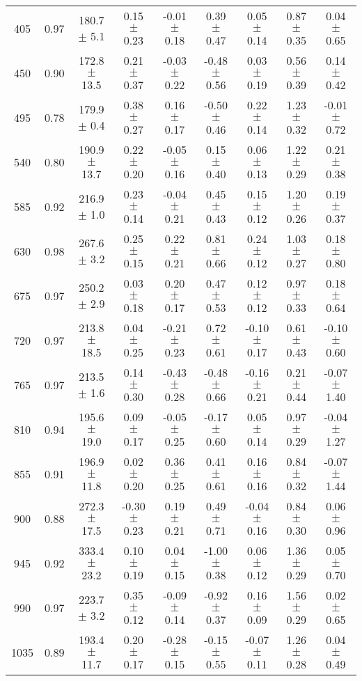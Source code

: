 \documentclass[twocolumn]{aastex61}%
\begin{document}
\begin{table*}[ht]
\begin{tabular}{ccc|ccccc|c}
405 & 0.97 & 180.7 $\pm$ 5.1 & 0.15 $\pm$ 0.23 & -0.01 $\pm$ 0.18 & 0.39 $\pm$ 0.47 & 0.05 $\pm$ 0.14 & 0.87 $\pm$ 0.35 & 0.04 $\pm$ 0.65\\
450 & 0.90 & 172.8 $\pm$ 13.5 & 0.21 $\pm$ 0.37 & -0.03 $\pm$ 0.22 & -0.48 $\pm$ 0.56 & 0.03 $\pm$ 0.19 & 0.56 $\pm$ 0.39 & 0.14 $\pm$ 0.42\\
495 & 0.78 & 179.9 $\pm$ 0.4 & 0.38 $\pm$ 0.27 & 0.16 $\pm$ 0.17 & -0.50 $\pm$ 0.46 & 0.22 $\pm$ 0.14 & 1.23 $\pm$ 0.32 & -0.01 $\pm$ 0.72\\
540 & 0.80 & 190.9 $\pm$ 13.7 & 0.22 $\pm$ 0.20 & -0.05 $\pm$ 0.16 & 0.15 $\pm$ 0.40 & 0.06 $\pm$ 0.13 & 1.22 $\pm$ 0.29 & 0.21 $\pm$ 0.38\\
585 & 0.92 & 216.9 $\pm$ 1.0 & 0.23 $\pm$ 0.14 & -0.04 $\pm$ 0.21 & 0.45 $\pm$ 0.43 & 0.15 $\pm$ 0.12 & 1.20 $\pm$ 0.26 & 0.19 $\pm$ 0.37\\
630 & 0.98 & 267.6 $\pm$ 3.2 & 0.25 $\pm$ 0.15 & 0.22 $\pm$ 0.21 & 0.81 $\pm$ 0.66 & 0.24 $\pm$ 0.12 & 1.03 $\pm$ 0.27 & 0.18 $\pm$ 0.80\\
675 & 0.97 & 250.2 $\pm$ 2.9 & 0.03 $\pm$ 0.18 & 0.20 $\pm$ 0.17 & 0.47 $\pm$ 0.53 & 0.12 $\pm$ 0.12 & 0.97 $\pm$ 0.33 & 0.18 $\pm$ 0.64\\
720 & 0.97 & 213.8 $\pm$ 18.5 & 0.04 $\pm$ 0.25 & -0.21 $\pm$ 0.23 & 0.72 $\pm$ 0.61 & -0.10 $\pm$ 0.17 & 0.61 $\pm$ 0.43 & -0.10 $\pm$ 0.60\\
765 & 0.97 & 213.5 $\pm$ 1.6 & 0.14 $\pm$ 0.30 & -0.43 $\pm$ 0.28 & -0.48 $\pm$ 0.66 & -0.16 $\pm$ 0.21 & 0.21 $\pm$ 0.44 & -0.07 $\pm$ 1.40\\
810 & 0.94 & 195.6 $\pm$ 19.0 & 0.09 $\pm$ 0.17 & -0.05 $\pm$ 0.25 & -0.17 $\pm$ 0.60 & 0.05 $\pm$ 0.14 & 0.97 $\pm$ 0.29 & -0.04 $\pm$ 1.27\\
855 & 0.91 & 196.9 $\pm$ 11.8 & 0.02 $\pm$ 0.20 & 0.36 $\pm$ 0.25 & 0.41 $\pm$ 0.61 & 0.16 $\pm$ 0.16 & 0.84 $\pm$ 0.32 & -0.07 $\pm$ 1.44\\
900 & 0.88 & 272.3 $\pm$ 17.5 & -0.30 $\pm$ 0.23 & 0.19 $\pm$ 0.21 & 0.49 $\pm$ 0.71 & -0.04 $\pm$ 0.16 & 0.84 $\pm$ 0.30 & 0.06 $\pm$ 0.96\\
945 & 0.92 & 333.4 $\pm$ 23.2 & 0.10 $\pm$ 0.19 & 0.04 $\pm$ 0.15 & -1.00 $\pm$ 0.38 & 0.06 $\pm$ 0.12 & 1.36 $\pm$ 0.29 & 0.05 $\pm$ 0.70\\
990 & 0.97 & 223.7 $\pm$ 3.2 & 0.35 $\pm$ 0.12 & -0.09 $\pm$ 0.14 & -0.92 $\pm$ 0.37 & 0.16 $\pm$ 0.09 & 1.56 $\pm$ 0.29 & 0.02 $\pm$ 0.65\\
1035 & 0.89 & 193.4 $\pm$ 11.7 & 0.20 $\pm$ 0.17 & -0.28 $\pm$ 0.15 & -0.15 $\pm$ 0.55 & -0.07 $\pm$ 0.11 & 1.26 $\pm$ 0.28 & 0.04 $\pm$ 0.49\\

\end{tabular}
\end{table*}
\end{document}
